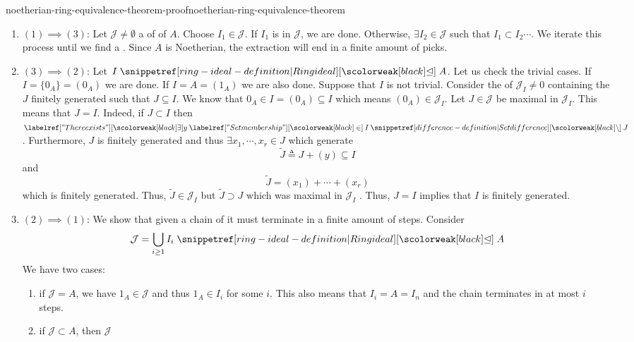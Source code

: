 \documentclass[preview]{standalone}
\begin{document}
\begin{snippetproof}{noetherian-ring-equivalence-theorem-proof}{noetherian-ring-equivalence-theorem}{}
    \begin{enumerate}
        \item \((1) \implies (3)\): Let \(\mathcal{J} \neq \emptyset\)
        a \set of \ideal[ideals] of \(A\).
        Choose \(I_1 \in \mathcal{J}\).
        If \(I_1\) is \maximalideal[maximal] in \(\mathcal{J}\), we are done.
        Otherwise, \(\exists I_2 \in \mathcal{J}\) such that \(I_1 \subset I_2 \cdots\).
        We iterate this process until we find a \maximalideal.
        Since \(A\) is Noetherian, the extraction will end in a finite amount of picks.
        \item \((3) \implies (2)\): Let \(I \idealin A\).
        Let us check the trivial cases.
        If \(I = \{0_A\} = (0_A)\) we are done.
        If \(I = A = (1_A)\) we are also done.
        Suppose that \(I\) is not trivial.
        Consider the \set of \ideal[ideals] \(\mathcal{J}_I \neq 0\) containing the \ideal[ideals] \(J\)
        finitely generated such that \(J \subseteq I\).
        We know that \(0_A \in I = (0_A) \subseteq I\)
        which means \((0_A) \in \mathcal{J}_I\).
        Let \(J \in \mathcal{J}\) be maximal in \(\mathcal{J}_I\).
        This means that \(J = I\).
        Indeed, if \(J \subset I\) then \(\exists y \in I \difference J\).
        Furthermore, \(J\) is finitely generated and thus \(\exists x_1, \cdots, x_r \in J\)
        which generate
        \[
            \tilde{J} \triangleq J + (y) \subseteq I
        \]
        and
        \[
            \tilde{J} = (x_1) + \cdots + (x_r)
        \]
        which is finitely generated.
        Thus, \(\tilde{J} \in \mathcal{J}_I\) but \(\tilde{J} \supset J\) which was maximal
        in \(\mathcal{J}_I\) \lightning.
        Thus, \(J = I\) implies that \(I\) is finitely generated.
        \item \((2) \implies (1)\):
        We show that given a chain of \ideal[ideals]
        it must terminate in a finite amount of steps.
        Consider
        \[
            \mathcal{J} = \bigcup_{i\geq 1} I_i \idealin A
        \]
        We have two cases:
        \begin{enumerate}
            \item if \(\mathcal{J} = A\), we have \(1_A \in \mathcal{J}\)
            and thus \(1_A \in I_i\) for some \(i\).
            This also means that \(I_i = A = I_n\)
            and the chain terminates in at most \(i\) steps.
            \item if \(\mathcal{J} \subset A\), then \(\mathcal{J}\)

\end{enumerate}
\end{enumerate}
\end{snippetproof}
\end{document}
